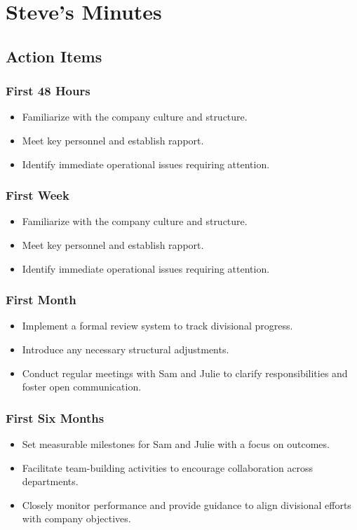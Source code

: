 \documentclass[a4paper,12pt]{article}
\begin{document}
\section{Steve's Minutes}
\author{Bahne Thiel-Peters (Julie)}

\subsection{Action Items}

\subsubsection{First 48 Hours}
\begin{itemize}
    \item Familiarize with the company culture and structure.
    \item Meet key personnel and establish rapport.
    \item Identify immediate operational issues requiring attention.
\end{itemize}

\subsubsection{First Week}
\begin{itemize}
    \item Familiarize with the company culture and structure.
    \item Meet key personnel and establish rapport.
    \item Identify immediate operational issues requiring attention.
\end{itemize}

\subsubsection{First Month}
\begin{itemize}
    \item Implement a formal review system to track divisional progress.
    \item Introduce any necessary structural adjustments.
    \item Conduct regular meetings with Sam and Julie to clarify responsibilities and foster open communication.
\end{itemize}

\subsubsection{First Six Months}
\begin{itemize}
    \item Set measurable milestones for Sam and Julie with a focus on outcomes.
    \item Facilitate team-building activities to encourage collaboration across departments.
    \item Closely monitor performance and provide guidance to align divisional efforts with company objectives.
\end{itemize}
\end{document}
